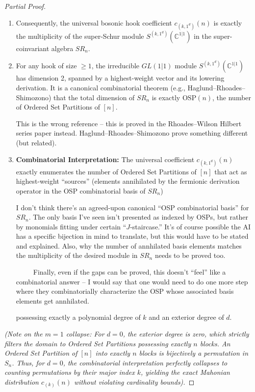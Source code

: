 \documentclass[12pt]{article}
\newcommand{\review}[1]{\begin{reviewbox}#1\end{reviewbox}}
\begin{document}
\begin{proof}[Partial Proof]
\begin{enumerate}
    \item Consequently, the universal bosonic hook coefficient $c_{(k, 1^d)}(n)$ is exactly the multiplicity of the super-Schur module $S^{(k, 1^d)}(\mathbb{C}^{1|1})$ in the super-coinvariant algebra $SR_n$. 
    
    \item For any hook of size $\ge 1$, the irreducible $GL(1|1)$ module $S^{(k, 1^d)}(\mathbb{C}^{1|1})$ has dimension 2, spanned by a highest-weight vector and its lowering derivation. It is a canonical combinatorial theorem (e.g., Haglund--Rhoades--Shimozono) that the total dimension of $SR_n$ is exactly $\mathrm{OSP}(n)$, the number of Ordered Set Partitions of $[n]$. \review{This is the wrong reference -- this is proved in the  Rhoades--Wilson Hilbert series paper instead. Haglund--Rhoades--Shimozono prove something different (but related).}
    
    \item \textbf{Combinatorial Interpretation:} The universal coefficient $c_{(k, 1^d)}(n)$ exactly enumerates the number of Ordered Set Partitions of $[n]$ that act as highest-weight ``sources'' (elements annihilated by the fermionic derivation operator in the OSP combinatorial basis of $SR_n$) \review{I don't think there's an agreed-upon canonical ``OSP combinatorial basis'' for $SR_n$. The only basis I've seen isn't presented as indexed by OSPs, but rather by monomials fitting under certain ``$J$-staircase.'' It's of course possible the AI has a specific bijection in mind to translate, but this would have to be stated and explained. Also, why the number of annhilated basis elements matches the multiplicity of the desired module in $SR_n$ needs to be proved too.
    
    \ \ \ \ \ Finally, even if the gaps can be proved, this doesn't ``feel'' like a combinatorial answer -- I would say that one would need to do one more step where they combinatorially characterize the OSP whose associated basis elements get annhilated.} possessing exactly a polynomial degree of $k$ and an exterior degree of $d$. 
\end{enumerate}

\emph{(Note on the $m=1$ collapse: For $d=0$, the exterior degree is zero, which strictly filters the domain to Ordered Set Partitions possessing exactly $n$ blocks. An Ordered Set Partition of $[n]$ into exactly $n$ blocks is bijectively a permutation in $S_n$. Thus, for $d=0$, the combinatorial interpretation perfectly collapses to counting permutations by their major index $k$, yielding the exact Mahonian distribution $c_{(k)}(n)$ without violating cardinality bounds).}
\end{proof}
\end{document}
